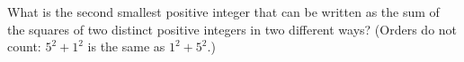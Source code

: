 What is the second smallest positive integer that can be written as the sum of the squares of two distinct positive integers in two different ways? (Orders do not count: $5^2+1^2$ is the same as $1^2+5^2$.)
